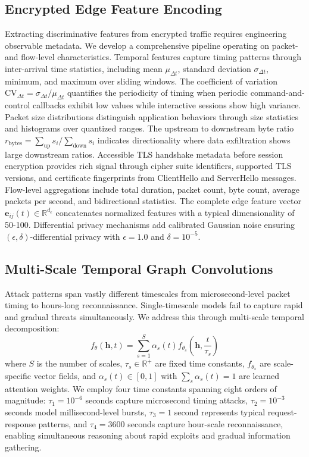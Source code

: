 \documentclass[lettersize,journal]{IEEEtran}
\newcommand{\R}{\mathbb{R}}
\begin{document}
\subsection{Encrypted Edge Feature Encoding}

Extracting discriminative features from encrypted traffic requires engineering observable metadata. We develop a comprehensive pipeline operating on packet- and flow-level characteristics. Temporal features capture timing patterns through inter-arrival time statistics, including mean $\mu_{\Delta t}$, standard deviation $\sigma_{\Delta t}$, minimum, and maximum over sliding windows. The coefficient of variation $\text{CV}_{\Delta t} = \sigma_{\Delta t} / \mu_{\Delta t}$ quantifies the periodicity of timing when periodic command-and-control callbacks exhibit low values while interactive sessions show high variance. Packet size distributions distinguish application behaviors through size statistics and histograms over quantized ranges. The upstream to downstream byte ratio $r_{\text{bytes}} = \sum_{\text{up}} s_i / \sum_{\text{down}} s_i$ indicates directionality where data exfiltration shows large downstream ratios. Accessible TLS handshake metadata before session encryption provides rich signal through cipher suite identifiers, supported TLS versions, and certificate fingerprints from ClientHello and ServerHello messages. Flow-level aggregations include total duration, packet count, byte count, average packets per second, and bidirectional statistics. The complete edge feature vector $\mathbf{e}_{ij}(t) \in \R^{d_e}$ concatenates normalized features with a typical dimensionality of 50-100. Differential privacy mechanisms add calibrated Gaussian noise ensuring $(\epsilon, \delta)$-differential privacy with $\epsilon = 1.0$ and $\delta = 10^{-5}$.

\subsection{Multi-Scale Temporal Graph Convolutions}

Attack patterns span vastly different timescales from microsecond-level packet timing to hours-long reconnaissance. Single-timescale models fail to capture rapid and gradual threats simultaneously. We address this through multi-scale temporal decomposition:
\begin{equation}
f_\theta(\mathbf{h}, t) = \sum_{s=1}^S \alpha_s(t) f_{\theta_s}\left(\mathbf{h}, \frac{t}{\tau_s}\right)
\label{eq:multiscale}
\end{equation}
where $S$ is the number of scales, $\tau_s \in \R^+$ are fixed time constants, $f_{\theta_s}$ are scale-specific vector fields, and $\alpha_s(t) \in [0,1]$ with $\sum_s \alpha_s(t) = 1$ are learned attention weights. We employ four time constants spanning eight orders of magnitude: $\tau_1 = 10^{-6}$ seconds capture microsecond timing attacks, $\tau_2 = 10^{-3}$ seconds model millisecond-level bursts, $\tau_3 = 1$ second represents typical request-response patterns, and $\tau_4 = 3600$ seconds capture hour-scale reconnaissance, enabling simultaneous reasoning about rapid exploits and gradual information gathering.
\end{document}
